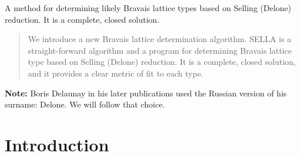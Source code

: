 \documentclass[preprint]{iucr}              %
\begin{document}


\maketitle                        %

\begin{synopsis}
A method for determining likely Bravais lattice types based on Selling (Delone) 
reduction. It is a complete, closed solution.
\end{synopsis}

\begin{abstract}
We introduce a new Bravais lattice determination algorithm. SELLA is a 
straight-forward algorithm and a program for determining Bravais lattice type 
based on Selling (Delone) reduction. It is a complete, closed solution, 
and it provides a clear metric of fit to each type.
\end{abstract}
		
{\bf Note:}  Boris Delaunay in his later publications used the Russian version 
of his surname: Delone. We will follow that choice.\\



\section{Introduction}
\end{document}
